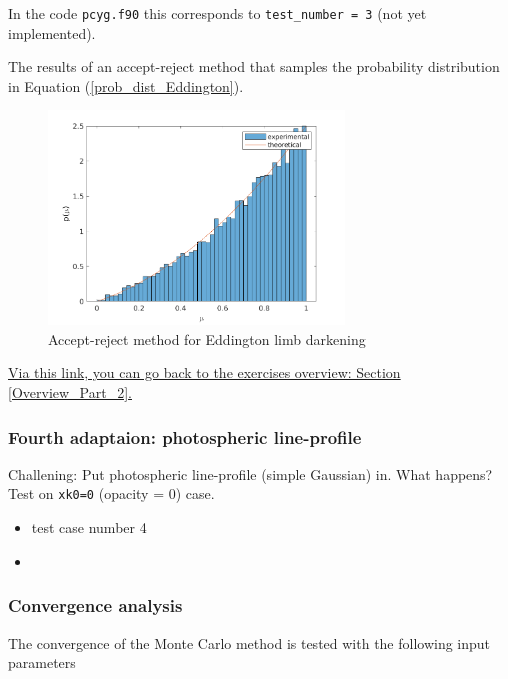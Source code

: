 \documentclass[../main/main.tex]{subfiles}
\begin{document}
\begin{enumerate}
In the code \texttt{pcyg.f90} this corresponds to \texttt{test\_number = 3} (not yet implemented). 

The results of an accept-reject method that samples the probability distribution in Equation (\ref{prob_dist_Eddington}).

\begin{figure}[!htp]
\centering
\includegraphics[width=0.7\textwidth]{../../introductory_exercises/P_Cygni_profile_UV_resonance/Eddington_accept_reject.png}
\caption{Accept-reject method for Eddington limb darkening}
\end{figure}

\end{enumerate}



\underline{Via this link, you can go back to the exercises overview: Section \ref{Overview_Part_2}.}

\newpage
\subsubsection{Fourth adaptaion: photospheric line-profile}
Challening: Put photospheric line-profile (simple Gaussian) in. What happens? Test on \texttt{xk0=0} (opacity = 0) case.

\begin{itemize}
\item test case number 4 
\item \noindent{}
\end{itemize}

\newpage
\subsubsection{Convergence analysis}
\label{convergence_analysis}

The convergence of the Monte Carlo method is tested with the following input parameters
\end{document}
